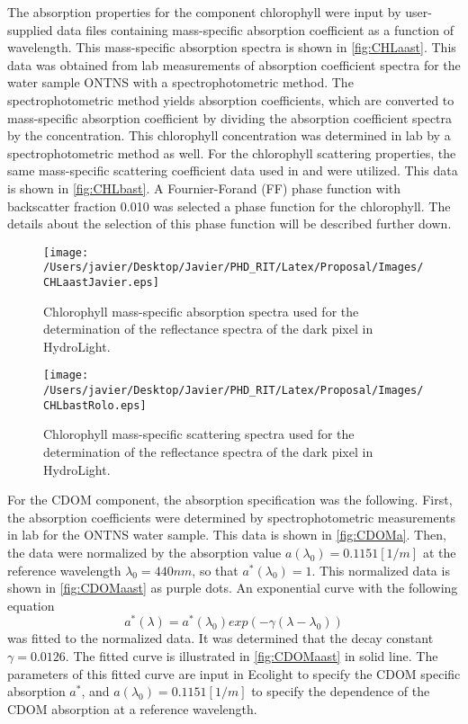 The absorption properties for the component chlorophyll were input by user-supplied data files containing mass-specific absorption coefficient as a function of wavelength. This mass-specific absorption spectra is shown in \autoref{fig:CHLaast}. This data was obtained from lab measurements of absorption coefficient spectra for the water sample ONTNS with a { spectrophotometric method}. The spectrophotometric method yields absorption coefficients, which are converted to mass-specific absorption coefficient by dividing the absorption coefficient spectra by the concentration. This chlorophyll concentration was determined in lab by a { spectrophotometric method} as well. For the chlorophyll scattering properties, the same mass-specific scattering coefficient data used in \cite{Raqueno:2000} and \cite{Raqueno:2003} were utilized. This data is shown in \autoref{fig:CHLbast}. A Fournier-Forand (FF) phase function with backscatter fraction 0.010 was selected a phase function for the chlorophyll. The details about the selection of this phase function will be described { further down}.
\begin{figure}[htb]
  	\centering
  	\texttt{[image: /Users/javier/Desktop/Javier/PHD\_RIT/Latex/Proposal/Images/CHLaastJavier.eps]}
  \caption{Chlorophyll mass-specific absorption spectra used for the determination of the reflectance spectra of the dark pixel in HydroLight. \label{fig:CHLaast} } 
\end{figure}


\begin{figure}[htb]
  	\centering
  	\texttt{[image: /Users/javier/Desktop/Javier/PHD\_RIT/Latex/Proposal/Images/CHLbastRolo.eps]}
  \caption{Chlorophyll mass-specific scattering spectra used for the determination of the reflectance spectra of the dark pixel in HydroLight. \label{fig:CHLbast} } 
\end{figure}

For the CDOM component, the absorption specification was the following. First, the absorption coefficients were determined by spectrophotometric measurements in lab for the ONTNS water sample. This data is shown in \autoref{fig:CDOMa}. Then, the data were normalized by the absorption value $a(\lambda_0)=0.1151[1/m]$ at the reference wavelength $\lambda_0=440nm$, so that $a^*(\lambda_0)=1$. This normalized data is shown in \autoref{fig:CDOMaast} as purple dots. An exponential curve with the following equation
\begin{equation}
	\label{eq:CDOMabs}
	a^*(\lambda)=a^*(\lambda_0)exp(-\gamma(\lambda-\lambda_0))
\end{equation}
was fitted to the normalized data. It was determined that the decay constant $\gamma=0.0126$. The fitted curve is illustrated in \autoref{fig:CDOMaast} in solid line. The parameters of this fitted curve are input in Ecolight to specify the CDOM specific absorption $a^*$, and $a(\lambda_0)=0.1151[1/m]$ to specify the dependence of the CDOM absorption at a reference wavelength.


